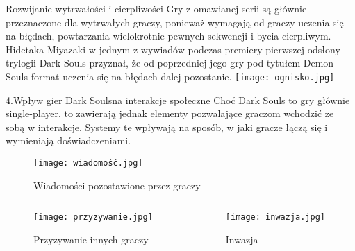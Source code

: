 \documentclass{beamer}
\begin{document}
\begin{frame}{Rozwijanie wytrwałości i cierpliwości}  %
\small Gry z omawianej serii są głównie przeznaczone dla wytrwałych graczy, ponieważ wymagają od graczy uczenia się na błędach, powtarzania wielokrotnie pewnych sekwencji i bycia cierpliwym. Hidetaka Miyazaki w jednym z wywiadów podczas premiery pierwszej odsłony trylogii Dark Souls przyznał, że od poprzedniej jego gry pod tytułem Demon Souls format uczenia się na błędach dalej pozostanie.
\centering
    \texttt{[image: ognisko.jpg]}

\end{frame}

\begin{frame}{4.Wpływ gier \glqq Dark Souls\grqq na interakcje społeczne}  %
\small Choć Dark Souls  to gry głównie single-player, to zawierają jednak elementy pozwalające graczom wchodzić ze sobą w interakcje. Systemy te wpływają na sposób, w jaki gracze łączą się i wymieniają doświadczeniami.

\begin{figure}
\centering
    \texttt{[image: wiadomość.jpg]}
    \caption{Wiadomości pozostawione przez graczy}

\end{figure}
\end{frame}

\begin{frame} %
\begin{columns}
\begin{column}{0.5\textwidth}
\begin{figure}
\centering
    \texttt{[image: przyzywanie.jpg]}
    \caption{Przyzywanie innych graczy}
\end{figure}
\end{column}

\begin{column}{0.5\textwidth}
\begin{figure}
\centering
    \texttt{[image: inwazja.jpg]}
    \caption{Inwazja}
    
\end{figure}
\end{column}
\end{columns}
\end{frame}
\end{document}
